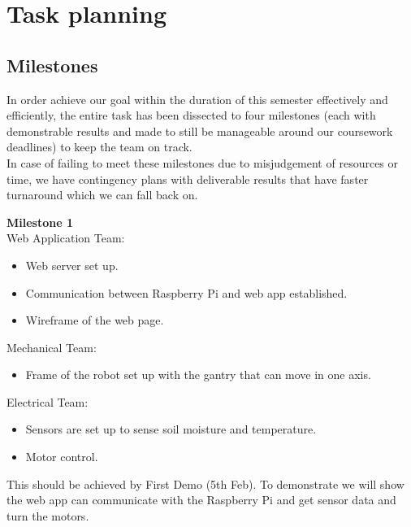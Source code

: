 \documentclass{article}
\begin{document}
\section{Task planning}


\subsection{Milestones} 

In order achieve our goal within the duration of this semester effectively and efficiently, the entire task has been dissected to four milestones (each with demonstrable results and made to still be manageable around our coursework deadlines) to keep the team on track.
\\
In case of failing to meet these milestones due to misjudgement of resources or time, we have contingency plans with deliverable results that have faster turnaround which we can fall back on.

\textbf{Milestone 1}  
 \\ Web Application Team:
\begin{itemize}
    \vspace{-3mm}
    \setlength\itemsep{-0.6em}
    \item Web server set up.
    \item Communication between Raspberry Pi and web app established.
    \item Wireframe of the web page.
    \vspace{-3mm}
\end{itemize}
Mechanical Team:
\begin{itemize}
    \vspace{-3mm}
    \setlength\itemsep{-0.6em}
    \item Frame of the robot set up with the gantry that can move in one axis. 
    \vspace{-3mm}
\end{itemize}
Electrical Team:
\begin{itemize}
    \vspace{-3mm}
    \setlength\itemsep{-0.6em}
    \item Sensors are set up to sense soil moisture and temperature.
    \item Motor control.
    \vspace{-3mm}
\end{itemize}

This should be achieved by First Demo (5th Feb). To demonstrate we will show the web app can communicate with the Raspberry Pi and get sensor data and turn the motors.
\end{document}
